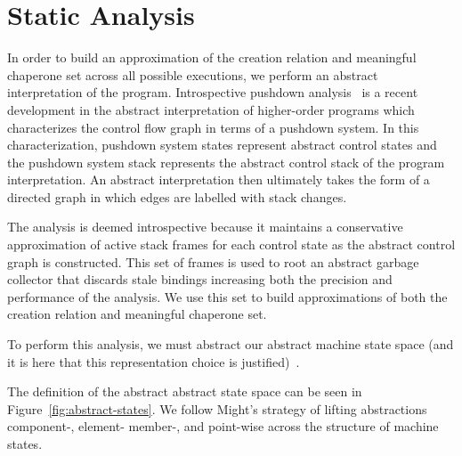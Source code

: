 \section{Static Analysis}

In order to build an approximation of the creation relation and meaningful chaperone set across all possible executions, we perform an abstract interpretation of the program.
Introspective pushdown analysis~\cite{earl2012introspective} is a recent development in the abstract interpretation of higher-order programs which characterizes the control flow graph in terms of a pushdown system.
In this characterization, pushdown system states represent abstract control states and the pushdown system stack represents the abstract control stack of the program interpretation.
An abstract interpretation then ultimately takes the form of a directed graph in which edges are labelled with stack changes.

The analysis is deemed introspective because it maintains a conservative approximation of active stack frames for each control state as the abstract control graph is constructed.
This set of frames is used to root an abstract garbage collector that discards stale bindings increasing both the precision and performance of the analysis.
We use this set to build approximations of both the creation relation and meaningful chaperone set.

To perform this analysis, we must abstract our abstract machine state space (and it is here that this representation choice is justified)~\cite{van2010abstracting}.

The definition of the abstract abstract state space can be seen in Figure~\ref{fig:abstract-states}.
We follow Might's strategy of lifting abstractions component-, element- member-, and point-wise across the structure of machine states.

\newcommand{\astxclass}[4]{$#1\in\widehat{\mathbf{#2}}$ &::=& #3 & #4}
\newcommand{\aks}[0]{\hat{\gamma}^*}

